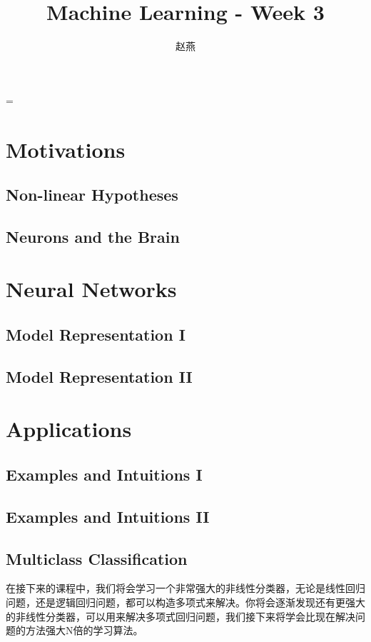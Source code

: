 \documentclass{article}
\title{Machine Learning - Week 3}
\author{赵燕}
\date{}
\begin{document}
 
\hfuzz=\maxdimen
{}
\begin{CJK}{UTF8}{gbsn} 
\maketitle
\renewcommand\contentsname{目录}
\renewcommand\figurename{图}
\tableofcontents
\newpage

\section{Motivations}
\subsection{Non-linear Hypotheses}
\subparagraph{}
\subsection{Neurons and the Brain}
\subparagraph{}
\section{Neural Networks}
\subsection{Model Representation I}
\subsection{Model Representation II}
\section{Applications}
\subsection{Examples and Intuitions I}
\subsection{Examples and Intuitions II}
\subsection{Multiclass Classification}
在接下来的课程中，我们将会学习一个非常强大的非线性分类器，无论是线性回归问题，还是逻辑回归问题，都可以构造多项式来解决。你将会逐渐发现还有更强大的非线性分类器，可以用来解决多项式回归问题，我们接下来将学会比现在解决问题的方法强大N倍的学习算法。
\end{CJK}
\end{document}
